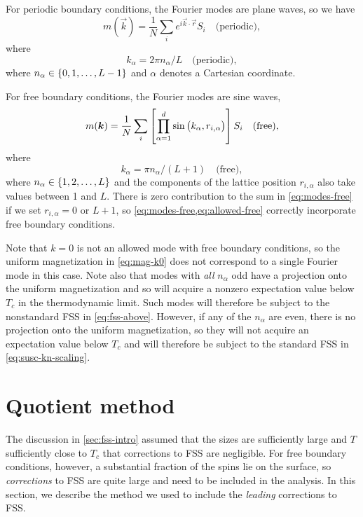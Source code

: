 For periodic boundary conditions, the Fourier modes are plane waves,
so we have
\begin{equation}
  m(\vec{k}) = \frac{1}{N} \sum_i e^{i\vec{k}\cdot\vec{r}} S_i
  \quad\text{(periodic)},
\end{equation}
where
\begin{equation}
  k_{\alpha} = 2\pi n_{\alpha}/L
  \quad\text{(periodic)},
\end{equation}
where $n_{\alpha}\in\cbr{0,1,\dots,L-1}$ and $\alpha$ denotes a Cartesian
coordinate.

For free boundary conditions, the Fourier modes are sine waves,
\begin{equation}
  m(\bm{k}) = \frac{1}{N} \sum_i
  \left[\prod_{\alpha=1}^d \sin\left(k_{\alpha},r_{i,\alpha}\right)\right] S_i
  \quad\text{(free)},
  \label{eq:modes-free}
\end{equation}
where
\begin{equation}
  k_{\alpha} = \pi n_{\alpha}/(L+1)
  \quad\text{(free)},
  \label{eq:allowed-free}
\end{equation}
where $n_{\alpha}\in\cbr{1,2,\dots,L}$ and the components of the lattice
position $r_{i,\alpha}$ also take values between 1 and $L$. There is zero
contribution to the sum in \cref{eq:modes-free} if we set $r_{i,\alpha}=0$ or
$L+1$, so \cref{eq:modes-free,eq:allowed-free} correctly incorporate free
boundary conditions.

Note that $k=0$ is not an allowed mode with free boundary conditions, so the
uniform magnetization in \cref{eq:mag-k0} does not correspond to a single
Fourier mode in this case. Note also that modes with \emph{all} $n_{\alpha}$
odd have a projection onto the uniform magnetization and so will acquire a
nonzero expectation value below $T_c$ in the thermodynamic limit. Such modes
will therefore be subject to the nonstandard FSS in \cref{eq:fss-above}.
However, if any of the $n_{\alpha}$ are even, there is no projection onto the
uniform magnetization, so they will not acquire an expectation value below
$T_c$ and will therefore be subject to the standard FSS in
\cref{eq:susc-kn-scaling}.


\section{Quotient method}
\label{sec:fss-quotient}

The discussion in \cref{sec:fss-intro} assumed that the sizes are
sufficiently large and $T$ sufficiently close to $T_c$ that corrections to FSS
are negligible. For free boundary conditions, however, a substantial fraction
of the spins lie on the surface, so \emph{corrections} to FSS are quite large
and need to be included in the analysis. In this section, we describe the
method we used to include the \emph{leading} corrections to FSS.

